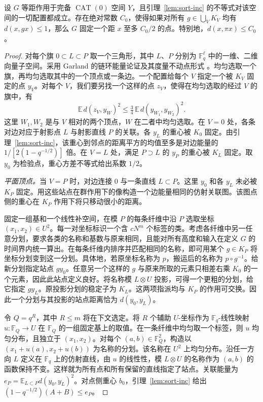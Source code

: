 \begin{lemma}\label{lem:sort-geometry} 设 $G$ 等距作用于完备 $\operatorname{CAT}(0)$ 空间 $Y$，且引理~\ref{lem:sort-inc} 的不等式对该空间的一切配置都成立。存在绝对常数 $C_0$，使得如果对所有 $g\in\bigcup_V K_V$ 均有 $d(x,gx)\le1$，那么 $G$ 固定一个距 $x$ 至多 $C_0/2$ 的点。特别地，$d(x,\pi x)\le C_0$。\end{lemma}

\begin{proof} 对每个旗 $0\subset L\subset P$ 取一个三角形，其中 $L$、$P$ 分别为 $\mathbb F_q^\ell$ 中的一维、二维向量子空间。采用 Garland 的链环能量论证及其度量不动点形式 \cite{garland,izekinayatani}。均匀选取一个旗，再均匀选取其中的一个顶点或一条边。一个配置给每个 $V$ 指定一个被 $K_V$ 固定的点 $y_V$。对每个 $V$，我们要另找一个这样的点 $z_V$，使得在均匀选取的经过 $V$ 的旗中，有 \begin{equation}\label{eq:sort-flag-link}
 \mathbb E\,d(z_V,y_W)^2\le \tfrac34\,
                           \mathbb E\,d(y_{W_1},y_{W_2})^2 .
\end{equation} 这里 $W_1,W_2$ 是与 $V$ 相对的两个顶点，$W$ 在二者中均匀选取。在 $V=0$ 处，各条对边对应于射影点 $L$ 与射影直线 $P$ 的关联。各 $y_L$ 的重心被 $K_0$ 固定。由引理~\ref{lem:sort-inc}，该重心到邻点的距离平方的均值至多是对边能量的 $1/[2(1-q^{-1/2})]$ 倍。在 $V=L$ 处，满足 $P\supset L$ 的 $y_P$ 的重心被 $K_L$ 固定。取 $y_0$ 为检验点，重心方差不等式给出系数 $1/2$。

\smallskip\noindent \emph{平面顶点。}当 $V=P$ 时，对边连接 $0$ 与一条直线 $L\subset P$。这里 $y_0$ 和各 $y_L$ 未必被 $K_P$ 固定。用这些站点在群作用下的像构造一个边能量相同的仿射关联图。该图点侧的重心在 $K_P$ 作用下将只移动很小的距离。

固定一组基和一个线性补空间，在模 $P$ 的每条纤维中沿 $P$ 选取坐标 $(x_1,x_2)\in U^2$。每一对坐标标识一个含 $cN^m$ 个标签的类。考虑各纤维中另一任意分划，要求各类的名称和基数与原来相同，且能对所有高度和输入在定义 $G$ 的时间界内统一算出。在每条纤维内排序并匹配相同的名称，即可用某个 $g\in K_P$ 将坐标分划变到这一分划。具体地，若原坐标名称为 $p$，搬运后的名称为 $p\circ g^{-1}$。给新分划指定站点 $g y_0$。任意另一个这样的 $g$ 与原来所取的元素只相差右乘 $K_0$ 的一个元素，因此此站点定义良好。将名称模 $L\otimes U$ 投影，可得一个更粗的分划，给它指定 $g y_L$。原投影分划的稳定子为 $K_L$。这两项指派均与 $K_P$ 的作用可交换。因此一个分划与其投影的站点距离恰为 $d(y_0,y_L)$。

令 $Q=q^R$，其中 $R\le m$ 将在下文选定。将 $R$ 个辅助 $U$-坐标作为 $\mathbb F_q$-线性映射 $u:\mathbb F_Q\to U$ 在 $\mathbb F_Q$ 的一组固定基上的取值。在一条纤维中均匀取一个标签，则 $u$ 均匀分布，且独立于 $(x_1,x_2)$。对每个 $(a,b)\in\mathbb F_Q^2$，构造以 $(x_1+u(a),x_2+u(b))$ 为名称的分划。该名称在 $U^2$ 上均匀分布。沿任一方向 $L$ 定义在 $\mathbb F_q$ 上的仿射直线，由 $u$ 的线性性，模 $L\otimes U$ 的名称作为 $(a,b)$ 的函数保持不变。这样就为所有点和所有保留的直线指定了站点。关联能量为 $e_P=\mathbb E_{L\subset P}d(y_0,y_L)^2$。对点侧重心 $b_0$，引理~\ref{lem:sort-inc} 给出 $(1-q^{-1/2})(A+B)\le e_P$。


\end{proof}
